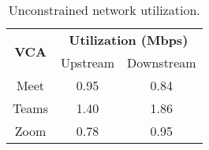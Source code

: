 \begin{table}[t]
\centering
\begin{tabular}{|c|c|c|}
\hline
\multirow{2}{*}{\textbf{VCA}} & 
    \multicolumn{2}{c|}{{\bf Utilization (Mbps)}} \\ 
    \cline{2-3} 
                              & Upstream                   & Downstream                  \\ \hline
Meet                          & 0.95                     & 0.84                      \\ 
Teams                         & 1.40                      & 1.86                      \\ 
Zoom                          & 0.78                     & 0.95                      \\ \hline
\end{tabular}
\caption{Unconstrained network utilization.}
\label{tab:vca_static}
\end{table}

